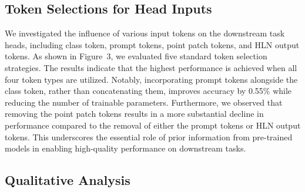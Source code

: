 \subsection{Token Selections for Head Inputs}  
We investigated the influence of various input tokens on the downstream task heads, including class token, prompt tokens, point patch tokens, and HLN output tokens. As shown in Figure~3, we evaluated five standard token selection strategies. The results indicate that the highest performance is achieved when all four token types are utilized. Notably, incorporating prompt tokens alongside the class token, rather than concatenating them, improves accuracy by 0.55\% while reducing the number of trainable parameters. Furthermore, we observed that removing the point patch tokens results in a more substantial decline in performance compared to the removal of either the prompt tokens or HLN output tokens. This underscores the essential role of prior information from pre-trained models in enabling high-quality performance on downstream tasks.


\subsection{Qualitative Analysis}





